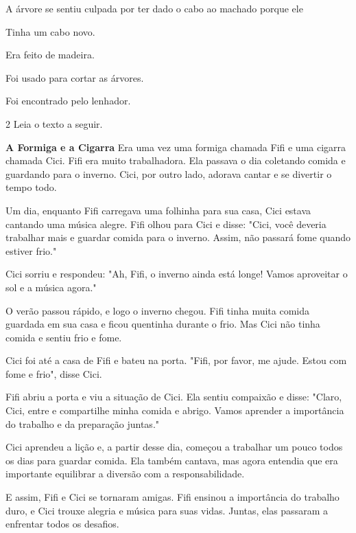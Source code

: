 A árvore se sentiu culpada por ter dado o cabo ao machado porque ele

\begin{escolha}
\item Tinha um cabo novo.

\item Era feito de madeira.

\item Foi usado para cortar as árvores.

\item Foi encontrado pelo lenhador.
\end{escolha}

\num{2} Leia o texto a seguir.

\begin{myquote}
\textbf{A Formiga e a Cigarra}
Era uma vez uma formiga chamada Fifi e uma cigarra chamada Cici. Fifi era muito trabalhadora. Ela passava o dia coletando comida e guardando para o inverno. Cici, por outro lado, adorava cantar e se divertir o tempo todo.

Um dia, enquanto Fifi carregava uma folhinha para sua casa, Cici estava cantando uma música alegre. Fifi olhou para Cici e disse: "Cici, você deveria trabalhar mais e guardar comida para o inverno. Assim, não passará fome quando estiver frio."

Cici sorriu e respondeu: "Ah, Fifi, o inverno ainda está longe! Vamos aproveitar o sol e a música agora."

O verão passou rápido, e logo o inverno chegou. Fifi tinha muita comida guardada em sua casa e ficou quentinha durante o frio. Mas Cici não tinha comida e sentiu frio e fome.

Cici foi até a casa de Fifi e bateu na porta. "Fifi, por favor, me ajude. Estou com fome e frio", disse Cici.

Fifi abriu a porta e viu a situação de Cici. Ela sentiu compaixão e disse: "Claro, Cici, entre e compartilhe minha comida e abrigo. Vamos aprender a importância do trabalho e da preparação juntas."

Cici aprendeu a lição e, a partir desse dia, começou a trabalhar um pouco todos os dias para guardar comida. Ela também cantava, mas agora entendia que era importante equilibrar a diversão com a responsabilidade.

E assim, Fifi e Cici se tornaram amigas. Fifi ensinou a importância do trabalho duro, e Cici trouxe alegria e música para suas vidas. Juntas, elas passaram a enfrentar todos os desafios.
\end{myquote}

